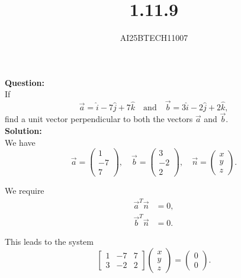 \documentclass[journal]{IEEEtran}
\begin{document}

\vspace{3cm}

\title{1.11.9}
\author{AI25BTECH11007}
 \maketitle
{\let\newpage\relax\maketitle}

\renewcommand{\thefigure}{\theenumi}
\renewcommand{\thetable}{\theenumi}
\setlength{\intextsep}{10pt} %


\renewcommand{\thetable}{\theenumi}
\noindent
\textbf{Question:}\\
If
\[
\vec{a} = \hat{i} - 7\hat{j} + 7\hat{k}
\quad \text{and} \quad
\vec{b} = 3\hat{i} - 2\hat{j} + 2\hat{k},
\]
find a unit vector perpendicular to both the vectors $\vec{a}$ and $\vec{b}$.\\

\textbf{Solution:}\\
We have
\[
\vec{a} = \begin{pmatrix}1\\-7\\7\end{pmatrix}, 
\quad 
\vec{b} = \begin{pmatrix}3\\-2\\2\end{pmatrix}, 
\quad 
\vec{n} = \begin{pmatrix}x\\y\\z\end{pmatrix}.
\]

We require
\begin{align}
\vec{a}^T \vec{n} &= 0, \label{eq:orth1}\\
\vec{b}^T \vec{n} &= 0. \label{eq:orth2}
\end{align}

This leads to the system
\[
\begin{bmatrix}
1 & -7 & 7\\
3 & -2 & 2
\end{bmatrix}
\begin{pmatrix}x\\y\\z\end{pmatrix}
=
\begin{pmatrix}0\\0\end{pmatrix}.
\]
\end{document}
